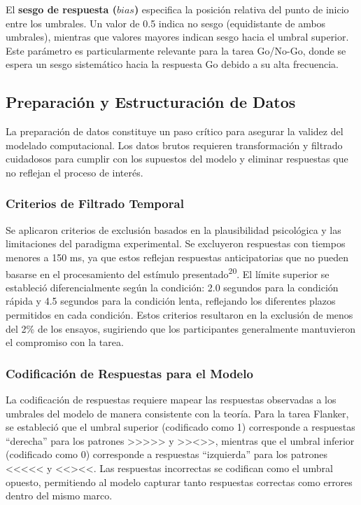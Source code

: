 \documentclass[
  spanish,
  10pt,
]{article}
\begin{document}
El \textbf{sesgo de respuesta (\(bias\))} especifica la posición
relativa del punto de inicio entre los umbrales. Un valor de 0.5 indica
no sesgo (equidistante de ambos umbrales), mientras que valores mayores
indican sesgo hacia el umbral superior. Este parámetro es
particularmente relevante para la tarea Go/No-Go, donde se espera un
sesgo sistemático hacia la respuesta Go debido a su alta frecuencia.

\subsection{Preparación y Estructuración de
Datos}\label{preparaciuxf3n-y-estructuraciuxf3n-de-datos}

La preparación de datos constituye un paso crítico para asegurar la
validez del modelado computacional. Los datos brutos requieren
transformación y filtrado cuidadosos para cumplir con los supuestos del
modelo y eliminar respuestas que no reflejan el proceso de interés.

\subsubsection{Criterios de Filtrado
Temporal}\label{criterios-de-filtrado-temporal}

Se aplicaron criterios de exclusión basados en la plausibilidad
psicológica y las limitaciones del paradigma experimental. Se excluyeron
respuestas con tiempos menores a 150 ms, ya que estos reflejan
respuestas anticipatorias que no pueden basarse en el procesamiento del
estímulo presentado\textsuperscript{20}. El límite superior se
estableció diferencialmente según la condición: 2.0 segundos para la
condición rápida y 4.5 segundos para la condición lenta, reflejando los
diferentes plazos permitidos en cada condición. Estos criterios
resultaron en la exclusión de menos del 2\% de los ensayos, sugiriendo
que los participantes generalmente mantuvieron el compromiso con la
tarea.

\subsubsection{Codificación de Respuestas para el
Modelo}\label{codificaciuxf3n-de-respuestas-para-el-modelo}

La codificación de respuestas requiere mapear las respuestas observadas
a los umbrales del modelo de manera consistente con la teoría. Para la
tarea Flanker, se estableció que el umbral superior (codificado como 1)
corresponde a respuestas ``derecha'' para los patrones
\textgreater\textgreater\textgreater\textgreater\textgreater{} y
\textgreater\textgreater\textless\textgreater\textgreater, mientras que
el umbral inferior (codificado como 0) corresponde a respuestas
``izquierda'' para los patrones
\textless\textless\textless\textless\textless{} y
\textless\textless\textgreater\textless\textless. Las respuestas
incorrectas se codifican como el umbral opuesto, permitiendo al modelo
capturar tanto respuestas correctas como errores dentro del mismo marco.
\end{document}
